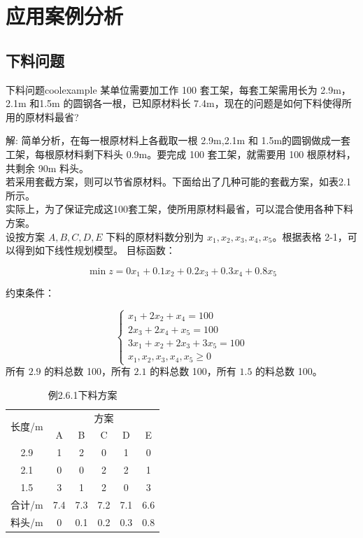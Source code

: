     \section{应用案例分析}
    \subsection{下料问题}
    \begin{exbox}{下料问题}{coolexample}
        某单位需要加工作 100 套工架，每套工架需用长为 2.9m，2.1m 和1.5m 的圆钢各一根，已知原材料长 7.4m，现在的问题是如何下料使得所用的原材料最省?

        解:
        简单分析，在每一根原材料上各截取一根 2.9m,2.1m 和 1.5m的圆钢做成一套工架，每根原材料剩下料头 0.9m。要完成 100 套工架，就需要用 100 根原材料，共剩余 90m 料头。
        \\若采用套截方案，则可以节省原材料。下面给出了几种可能的套截方案，如表2.1所示。\\
        实际上，为了保证完成这100套工架，使所用原材料最省，可以混合使用各种下料方案。\\
        设按方案 \( A, B, C, D, E \) 下料的原材料数分别为 \( x_1, x_2, x_3, x_4, x_5 \)。根据表格 2-1，可以得到如下线性规划模型。
        目标函数：

        \[
        \min z = 0x_1 + 0.1x_2 + 0.2x_3 + 0.3x_4 + 0.8x_5
        \]

        约束条件：

        \[
        \begin{cases}
        x_1 + 2x_2 + x_4 = 100 \\
        2x_3 + 2x_4 + x_5 = 100 \\
        3x_1 + x_2 + 2x_3 + 3x_5 = 100 \\
        x_1, x_2, x_3, x_4, x_5 \geq 0
        \end{cases}
        \]
        所有 \( 2.9 \) 的料总数 100，所有 \( 2.1 \) 的料总数 100，所有 \( 1.5 \) 的料总数 100。
    \end{exbox}

    \begin{table}[H]  %
        \centering
        \renewcommand{\arraystretch}{1.5} %
        \begin{tabular}{|c|c|c|c|c|c|}
        \hline
        \multirow{2}{*}{长度/m} & \multicolumn{5}{c|}{方案} \\ \cline{2-6} 
         & A & B & C & D & E \\ \hline
        2.9 & 1 & 2 & 0 & 1 & 0 \\ \hline
        2.1 & 0 & 0 & 2 & 2 & 1 \\ \hline
        1.5 & 3 & 1 & 2 & 0 & 3 \\ \hline
        合计/m & 7.4 & 7.3 & 7.2 & 7.1 & 6.6 \\ \hline
        料头/m & 0 & 0.1 & 0.2 & 0.3 & 0.8 \\ \hline
        \end{tabular}
        \caption{例2.6.1下料方案}
    \end{table}
        
